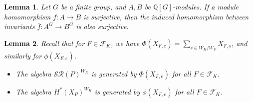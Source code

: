 \documentclass[10pt,a4paper]{amsart}
\newtheorem{lemma}{Lemma}
\newcommand{\Q}{\mathbb{Q}}
\begin{document}
\begin{lemma}\label{lem:equiv surjection} Let $G$ be a finite group, and $A,B$ be $\Q[G]$-modules. If a module homomorphism $f:A\to B$ is surjective, then the induced homomorphism between invariants $\bar{f}:A^G\to B^G$ is also surjective. 
\end{lemma} 

\begin{lemma}\label{lem:image}
  Recall that for $F\in\mathcal{F}_K$, we have
  $\Phi(X_{F,e})=\sum_{s\in W_K/W_F} X_{F,s}$,
  and similarly for $\phi(X_{F,e})$.
  \begin{itemize}
    \item[$(1)$] The algebra $\mathcal{SR}(P)^{W_K}$ is generated by $\Phi(X_{F,e})$ for all $F\in\mathcal{F}_K$.
    \item[$(2)$] The algebra $H^*(X_{P})^{W_K}$ is generated by $\phi(X_{F,e})$ for all $F\in\mathcal{F}_K$.
  \end{itemize}
\end{lemma}
\end{document}
